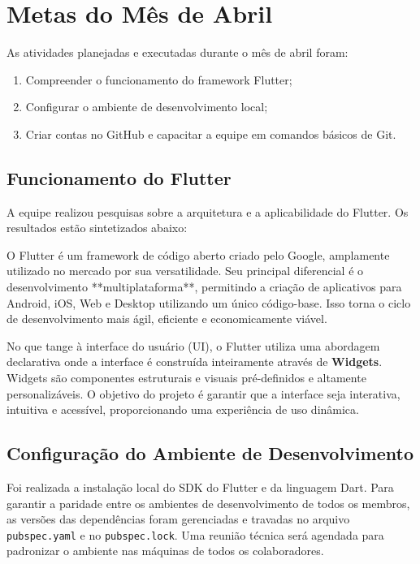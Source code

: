\section{Metas do Mês de Abril}
As atividades planejadas e executadas durante o mês de abril foram:

\begin{enumerate}
    \item Compreender o funcionamento do framework Flutter;
    \item Configurar o ambiente de desenvolvimento local;
    \item Criar contas no GitHub e capacitar a equipe em comandos básicos de Git.
\end{enumerate}

\subsection{Funcionamento do Flutter}
A equipe realizou pesquisas sobre a arquitetura e a aplicabilidade do Flutter. Os resultados estão sintetizados abaixo:

O Flutter é um framework de código aberto criado pelo Google, amplamente utilizado no mercado por sua versatilidade. Seu principal diferencial é o desenvolvimento **multiplataforma**, permitindo a criação de aplicativos para Android, iOS, Web e Desktop utilizando um único código-base. Isso torna o ciclo de desenvolvimento mais ágil, eficiente e economicamente viável.

No que tange à interface do usuário (UI), o Flutter utiliza uma abordagem declarativa onde a interface é construída inteiramente através de \textbf{Widgets}. Widgets são componentes estruturais e visuais pré-definidos e altamente personalizáveis. O objetivo do projeto é garantir que a interface seja interativa, intuitiva e acessível, proporcionando uma experiência de uso dinâmica.

\subsection{Configuração do Ambiente de Desenvolvimento}
Foi realizada a instalação local do SDK do Flutter e da linguagem Dart. Para garantir a paridade entre os ambientes de desenvolvimento de todos os membros, as versões das dependências foram gerenciadas e travadas no arquivo \texttt{pubspec.yaml} e no \texttt{pubspec.lock}. Uma reunião técnica será agendada para padronizar o ambiente nas máquinas de todos os colaboradores.

